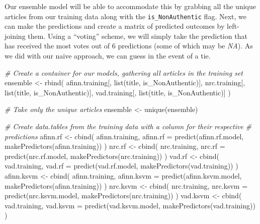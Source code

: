 \documentclass[
]{article}
\newenvironment{Shaded}{\begin{snugshade}}{\end{snugshade}}
\newcommand{\AttributeTok}[1]{\textcolor[rgb]{0.77,0.63,0.00}{#1}}
\newcommand{\CommentTok}[1]{\textcolor[rgb]{0.56,0.35,0.01}{\textit{#1}}}
\newcommand{\FunctionTok}[1]{\textcolor[rgb]{0.00,0.00,0.00}{#1}}
\newcommand{\NormalTok}[1]{#1}
\newcommand{\OtherTok}[1]{\textcolor[rgb]{0.56,0.35,0.01}{#1}}
\begin{document}
Our ensemble model will be able to accommodate this by grabbing all the
unique articles from our training data along with the
\texttt{is\_NonAuthentic} flag. Next, we can make the predictions and
create a matrix of predicted outcomes by left-joining them. Using a
``voting'' scheme, we will simply take the prediction that has received
the most votes out of 6 predictions (some of which may be \emph{NA}). As
we did with our naive approach, we can guess in the event of a tie.

\begin{Shaded}
\begin{Highlighting}[]
\CommentTok{\# Create a container for our models, gathering all articles in the training set}
\NormalTok{ensemble }\OtherTok{\textless{}{-}} \FunctionTok{rbind}\NormalTok{(}
\NormalTok{  afinn.training[, }\FunctionTok{list}\NormalTok{(title, is\_NonAuthentic)],}
\NormalTok{  nrc.training[, }\FunctionTok{list}\NormalTok{(title, is\_NonAuthentic)],}
\NormalTok{  vad.training[, }\FunctionTok{list}\NormalTok{(title, is\_NonAuthentic)]}
\NormalTok{)}

\CommentTok{\# Take only the unique articles}
\NormalTok{ensemble }\OtherTok{\textless{}{-}} \FunctionTok{unique}\NormalTok{(ensemble)}

\CommentTok{\# Create data.tables from the training data with a column for their respective}
\CommentTok{\# predictions}
\NormalTok{afinn.rf }\OtherTok{\textless{}{-}} \FunctionTok{cbind}\NormalTok{(}
\NormalTok{  afinn.training,}
  \AttributeTok{afinn.rf =} \FunctionTok{predict}\NormalTok{(afinn.rf.model, }\FunctionTok{makePredictors}\NormalTok{(afinn.training))}
\NormalTok{)}
\NormalTok{nrc.rf }\OtherTok{\textless{}{-}} \FunctionTok{cbind}\NormalTok{(}
\NormalTok{  nrc.training,}
  \AttributeTok{nrc.rf =} \FunctionTok{predict}\NormalTok{(nrc.rf.model, }\FunctionTok{makePredictors}\NormalTok{(nrc.training))}
\NormalTok{)}
\NormalTok{vad.rf }\OtherTok{\textless{}{-}} \FunctionTok{cbind}\NormalTok{(}
\NormalTok{  vad.training,}
  \AttributeTok{vad.rf =} \FunctionTok{predict}\NormalTok{(vad.rf.model, }\FunctionTok{makePredictors}\NormalTok{(vad.training))}
\NormalTok{)}
\NormalTok{afinn.ksvm }\OtherTok{\textless{}{-}} \FunctionTok{cbind}\NormalTok{(}
\NormalTok{  afinn.training,}
  \AttributeTok{afinn.ksvm =} \FunctionTok{predict}\NormalTok{(afinn.ksvm.model, }\FunctionTok{makePredictors}\NormalTok{(afinn.training))}
\NormalTok{)}
\NormalTok{nrc.ksvm }\OtherTok{\textless{}{-}} \FunctionTok{cbind}\NormalTok{(}
\NormalTok{  nrc.training,}
  \AttributeTok{nrc.ksvm =} \FunctionTok{predict}\NormalTok{(nrc.ksvm.model, }\FunctionTok{makePredictors}\NormalTok{(nrc.training))}
\NormalTok{)}
\NormalTok{vad.ksvm }\OtherTok{\textless{}{-}} \FunctionTok{cbind}\NormalTok{(}
\NormalTok{  vad.training,}
  \AttributeTok{vad.ksvm =} \FunctionTok{predict}\NormalTok{(vad.ksvm.model, }\FunctionTok{makePredictors}\NormalTok{(vad.training))}
\NormalTok{)}


\end{Highlighting}
\end{Shaded}
\end{document}
